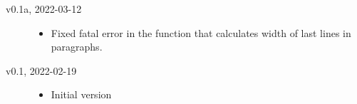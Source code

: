\documentclass{l3doc}
\begin{document}
\begin{description}
  \item[v0.1a, 2022-03-12]\hfill

    \begin{itemize}
      \item Fixed fatal error in the function that calculates width of last lines in paragraphs.
    \end{itemize}

  \item[v0.1, 2022-02-19]\hfill

    \begin{itemize}
      \item Initial version
    \end{itemize}
\end{description}
\end{document}
